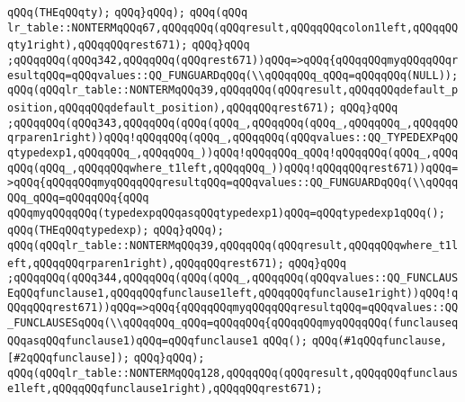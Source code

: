 \verb|qQQq(THEqQQqty);|\newline
\verb|qQQq}qQQq);|\newline
\verb|qQQq(qQQq|\newline
\verb|lr_table::NONTERMqQQq67,qQQqqQQq(qQQqresult,qQQqqQQqcolon1left,qQQqqQQqty1right),qQQqqQQqrest671);|\newline
\verb|qQQq}qQQq|\newline
\verb|;qQQqqQQq(qQQq342,qQQqqQQq(qQQqrest671))qQQq=>qQQq{qQQqqQQqmyqQQqqQQqresultqQQq=qQQqvalues::QQ_FUNGUARDqQQq(\\qQQqqQQq_qQQq=qQQqqQQq(NULL));|\newline
\verb|qQQq(qQQqlr_table::NONTERMqQQq39,qQQqqQQq(qQQqresult,qQQqqQQqdefault_position,qQQqqQQqdefault_position),qQQqqQQqrest671);|\newline
\verb|qQQq}qQQq|\newline
\verb|;qQQqqQQq(qQQq343,qQQqqQQq(qQQq(qQQq_,qQQqqQQq(qQQq_,qQQqqQQq_,qQQqqQQqrparen1right))qQQq!qQQqqQQq(qQQq_,qQQqqQQq(qQQqvalues::QQ_TYPEDEXPqQQqtypedexp1,qQQqqQQq_,qQQqqQQq_))qQQq!qQQqqQQq_qQQq!qQQqqQQq(qQQq_,qQQqqQQq(qQQq_,qQQqqQQqwhere_t1left,qQQqqQQq_))qQQq!qQQqqQQqrest671))qQQq=>qQQq{qQQqqQQqmyqQQqqQQqresultqQQq=qQQqvalues::QQ_FUNGUARDqQQq(\\qQQqqQQq_qQQq=qQQqqQQq{qQQq|\newline
\verb|qQQqmyqQQqqQQq(typedexpqQQqasqQQqtypedexp1)qQQq=qQQqtypedexp1qQQq();|\newline
\verb|qQQq(THEqQQqtypedexp);|\newline
\verb|qQQq}qQQq);|\newline
\verb|qQQq(qQQqlr_table::NONTERMqQQq39,qQQqqQQq(qQQqresult,qQQqqQQqwhere_t1left,qQQqqQQqrparen1right),qQQqqQQqrest671);|\newline
\verb|qQQq}qQQq|\newline
\verb|;qQQqqQQq(qQQq344,qQQqqQQq(qQQq(qQQq_,qQQqqQQq(qQQqvalues::QQ_FUNCLAUSEqQQqfunclause1,qQQqqQQqfunclause1left,qQQqqQQqfunclause1right))qQQq!qQQqqQQqrest671))qQQq=>qQQq{qQQqqQQqmyqQQqqQQqresultqQQq=qQQqvalues::QQ_FUNCLAUSESqQQq(\\qQQqqQQq_qQQq=qQQqqQQq{qQQqqQQqmyqQQqqQQq(funclauseqQQqasqQQqfunclause1)qQQq=qQQqfunclause1|\newline
\verb|qQQq();|\newline
\verb|qQQq(#1qQQqfunclause,[#2qQQqfunclause]);|\newline
\verb|qQQq}qQQq);|\newline
\verb|qQQq(qQQqlr_table::NONTERMqQQq128,qQQqqQQq(qQQqresult,qQQqqQQqfunclause1left,qQQqqQQqfunclause1right),qQQqqQQqrest671);|\newline
